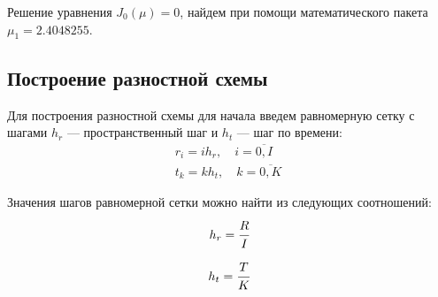 \documentclass[a4paper,12pt,russian, fleqn]{extreport}
\begin{document}
	Решение уравнения $J_0(\mu) = 0$, найдем при помощи математического пакета $\mu_1 = 2.4048255$.
	\subsection{Построение разностной схемы}
	
	Для построения разностной схемы для начала введем равномерную сетку с шагами $h_r$ --- пространственный шаг и $h_t$ --- шаг по времени:	
	\begin{equation}
	\begin{array}{l}
	r_i = ih_r, \quad i = \overline{0,I} \quad \\                         
	t_k = kh_t, \quad k = \overline{0,K}
	\end{array}
	\label{eq:grid}
	\end{equation}
	
	Значения шагов равномерной сетки можно найти из следующих соотношений:	
	\begin{equation*}
	h_r = \dfrac{\strut R}{\strut I}
	\end{equation*}	
	\begin{equation*}
	h_t = \dfrac{\strut T}{\strut K}
	\end{equation*}
\end{document}
